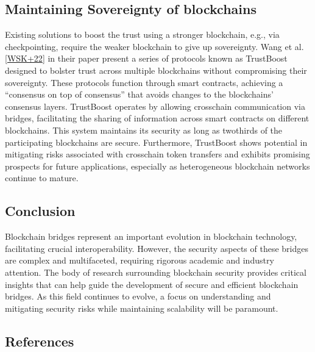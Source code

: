 \documentclass[letterpaper,10pt,english]{jupyterBook}
\begin{document}
\subsection{Maintaining Sovereignty of blockchains}
\label{\detokenize{BBSecurity/bbsecurity:maintaining-sovereignty-of-blockchains}}
\sphinxAtStartPar
Existing solutions to boost the trust using a stronger blockchain, e.g., via checkpointing, require the weaker blockchain to give up sovereignty. Wang et al. {[}\hyperlink{cite.BBSecurity/bbsecurity:id96}{WSK+22}{]} in their paper present a series of protocols known as TrustBoost designed to bolster trust across multiple blockchains without compromising their sovereignty. These protocols function through smart contracts, achieving a “consensus on top of consensus” that avoids changes to the blockchains’ consensus layers. TrustBoost operates by allowing cross\sphinxhyphen{}chain communication via bridges, facilitating the sharing of information across smart contracts on different blockchains. This system maintains its security as long as two\sphinxhyphen{}thirds of the participating blockchains are secure. Furthermore, TrustBoost shows potential in mitigating risks associated with cross\sphinxhyphen{}chain token transfers and exhibits promising prospects for future applications, especially as heterogeneous blockchain networks continue to mature.


\subsection{Conclusion}
\label{\detokenize{BBSecurity/bbsecurity:conclusion}}
\sphinxAtStartPar
Blockchain bridges represent an important evolution in blockchain technology, facilitating crucial interoperability. However, the security aspects of these bridges are complex and multifaceted, requiring rigorous academic and industry attention. The body of research surrounding blockchain security provides critical insights that can help guide the development of secure and efficient blockchain bridges. As this field continues to evolve, a focus on understanding and mitigating security risks while maintaining scalability will be paramount.




\subsection{References}
\label{\detokenize{BBSecurity/bbsecurity:references}}
\sphinxstepscope
\end{document}
